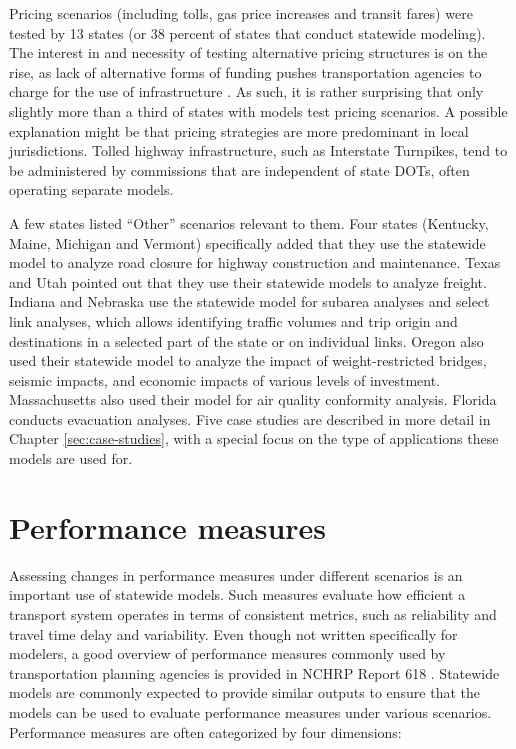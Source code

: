 Pricing scenarios (including tolls, gas price increases and transit fares) were tested by 13 states (or 38 percent of states that conduct statewide modeling). The interest in and necessity of testing alternative pricing structures is on the rise, as lack of alternative forms of funding pushes transportation agencies to charge for the use of infrastructure \citep{perez12}. As such, it is rather surprising that only slightly more than a third of states with models test pricing scenarios. A possible explanation might be that pricing strategies are more predominant in local jurisdictions. Tolled highway infrastructure, such as Interstate Turnpikes, tend to be administered by commissions that are independent of state DOTs, often operating separate models.

A few states listed ``Other'' scenarios relevant to them. Four states (Kentucky, Maine, Michigan and Vermont) specifically added that they use the statewide model to analyze road closure for highway construction and maintenance. Texas and Utah pointed out that they use their statewide models to analyze freight. Indiana and Nebraska use the statewide model for subarea analyses and select link analyses, which allows identifying traffic volumes and trip origin and destinations in a selected part of the state or on individual links. Oregon also used their statewide model to analyze the impact of weight-restricted bridges, seismic impacts, and economic impacts of various levels of investment. Massachusetts also used their model for air quality conformity analysis. Florida conducts evacuation analyses. Five case studies are described in more detail in Chapter \ref{sec:case-studies}, with a special focus on the type of applications these models are used for.

\section{Performance measures}

Assessing changes in performance measures under different scenarios is an important use of state\-wide models. Such measures evaluate how efficient a transport system operates in terms of consistent metrics, such as reliability and travel time delay and variability. Even though not written specifically for modelers, a good overview of performance measures commonly used by transportation planning agencies is provided in NCHRP Report 618 \citep{cambridge08}. Statewide models are commonly expected to provide similar outputs to ensure that the models can be used to evaluate performance measures under various scenarios. Performance measures are often categorized by four dimensions:

